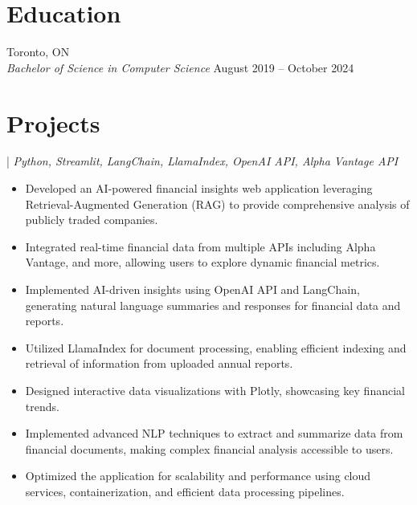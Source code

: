 \section{Education}

 \hfill Toronto, ON\\
{\it Bachelor of Science in Computer Science} \hfill August 2019 – October 2024

\section{Projects}

 | \emph{Python, Streamlit, LangChain, LlamaIndex, OpenAI API, Alpha Vantage API}
\begin{itemize} \itemsep -1pt
    \item Developed an AI-powered financial insights web application leveraging Retrieval-Augmented Generation (RAG) to provide comprehensive analysis of publicly traded companies.
    \item Integrated real-time financial data from multiple APIs including Alpha Vantage, and more, allowing users to explore dynamic financial metrics.
    \item Implemented AI-driven insights using OpenAI API and LangChain, generating natural language summaries and responses for financial data and reports.
    \item Utilized LlamaIndex for document processing, enabling efficient indexing and retrieval of information from uploaded annual reports.
    \item Designed interactive data visualizations with Plotly, showcasing key financial trends.
    \item Implemented advanced NLP techniques to extract and summarize data from financial documents, making complex financial analysis accessible to users.
    \item Optimized the application for scalability and performance using cloud services, containerization, and efficient data processing pipelines.
\end{itemize}

